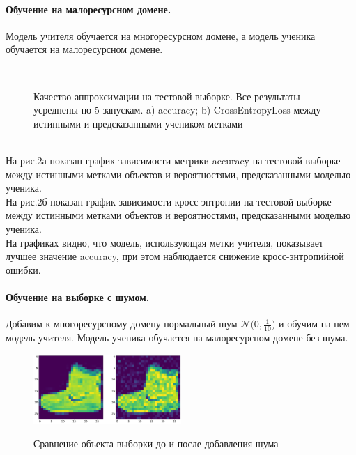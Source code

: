\paragraph{Обучение на малоресурсном домене.}
Модель учителя обучается на многоресурсном домене, а модель ученика обучается на малоресурсном домене.\\
\begin{figure}[h!t]\center
{}
\\
\caption{Качество аппроксимации на тестовой выборке. Все результаты усреднены по 5 запускам. a) accuracy; b) CrossEntropyLoss между истинными и предсказанными учеником метками}
\end{figure}\\
На рис.2а показан график зависимости метрики accuracy на тестовой выборке между истинными метками объектов и вероятностями, предсказанными моделью ученика.\\
На рис.2б показан график зависимости кросс-энтропии на тестовой выборке между истинными метками объектов и вероятностями, предсказанными моделью ученика.\\
На графиках видно, что модель, использующая метки учителя, показывает лучшее значение accuracy, при этом наблюдается снижение кросс-энтропийной ошибки.

\newpage
\paragraph{Обучение на выборке с шумом.}
Добавим к многоресурсному домену нормальный шум $\mathcal{N}\bigr(0,\frac{1}{10}\bigr)$ и обучим на нем модель учителя. Модель ученика обучается на малоресурсном домене без шума.
\begin{figure}[h!t]\center
{\includegraphics[width=0.5\textwidth]{results/noise}}
\caption{Сравнение объекта выборки до и после добавления шума}
\end{figure}\\

